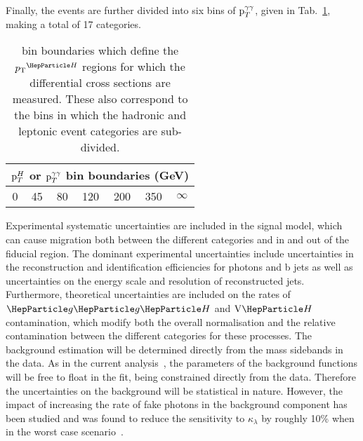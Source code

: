 Finally, the events are further divided into six bins of $\mathrm{p}_{T}^{\gamma\gamma}$, given in Tab.~\ref{tab:ttHdiff_CMS_ptbins}, making a total of 17 categories. 

\begin{table}[h]

 \centering
 \begin{tabular}{c|c|c|c|c|c|c}
    \multicolumn{7}{c}{$\mathrm{p}_{T}^{H}$ or $\mathrm{p}_{T}^{\gamma\gamma}$ bin boundaries (GeV)}  \\ \hline
    0 & 45 & 80 & 120 & 200 & 350 & $\infty$ \\\hline
\end{tabular}
\caption{bin boundaries which define the $\pTH$ regions for which the differential cross sections are measured. These also correspond to the bins in which the hadronic and leptonic event categories are sub-divided.}
\label{tab:ttHdiff_CMS_ptbins}
\end{table}

Experimental systematic uncertainties are included in the signal model, which can cause migration both between the different categories and in and out of the fiducial region. The dominant experimental uncertainties include uncertainties in the reconstruction and 
identification efficiencies for photons and b jets as well as uncertainties on the energy scale and resolution of reconstructed jets. 
Furthermore, theoretical uncertainties are included on the rates of $\ggh$ and $\vh$ contamination, which modify both the overall normalisation and the relative contamination between the different categories for these processes. The background estimation will be determined directly from the mass sidebands in the data. As in the current analysis~\cite{Sirunyan:2018ouh}, the parameters of the background functions will be free to float in the fit, being constrained directly from the data. Therefore the uncertainties on the background will be statistical in nature.
However, the impact of increasing the rate of fake photons in the background component has been studied and was found to reduce the sensitivity to $\kappa_\lambda$ by roughly 10\% when in the worst case scenario~\cite{CMS-PAS-FTR-18-020}.  


